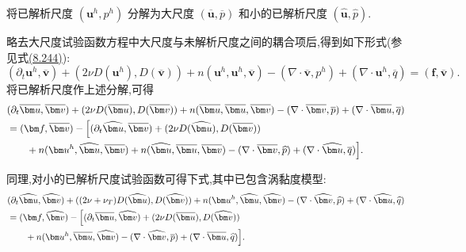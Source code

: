 \begin{note}
\label{note:vms-bubble-basic-equations}
将已解析尺度 $(\bm u^h,p^h)$ 分解为大尺度 $(\overline{\bm u},\overline p)$ 和小的已解析尺度 $(\widehat{\bm u},\widehat p)$.

略去大尺度试验函数方程中大尺度与未解析尺度之间的耦合项后,得到如下形式(参见式\hyperref[eq:vms-three-scale-model-large]{(8.244)}):
\[
 (\partial_t\bm u^h,\overline{\bm v})
 +(2\nu D(\bm u^h),D(\overline{\bm v}))
 +n(\bm u^h,\bm u^h,\overline{\bm v})
 -(\nabla\cdot\overline{\bm v},p^h)
 +(\nabla\cdot\bm u^h,\overline q)
 =(\bm f,\overline{\bm v}).
\]
将已解析尺度作上述分解,可得
\begin{equation}\label{eq:vms-bubble-large-scale-splitting}
\begin{aligned}
 &(\partial_t\overline{\bm u},\overline{\bm v})
 +(2\nu D(\overline{\bm u}),D(\overline{\bm v}))
 +n(\overline{\bm u},\overline{\bm u},\overline{\bm v})
 -(\nabla\cdot\overline{\bm v},\overline p)
 +(\nabla\cdot\overline{\bm u},\overline q)\\
 &=(\bm f,\overline{\bm v})-
 \Bigl[(\partial_t\widehat{\bm u},\overline{\bm v})
 +(2\nu D(\widehat{\bm u}),D(\overline{\bm v}))\\
 &\qquad+n(\bm u^h,\widehat{\bm u},\overline{\bm v})
 +n(\widehat{\bm u},\overline{\bm u},\overline{\bm v})
 -(\nabla\cdot\overline{\bm v},\widehat p)
 +(\nabla\cdot\widehat{\bm u},\overline q)\Bigr].
\end{aligned}
\end{equation}

同理,对小的已解析尺度试验函数可得下式,其中已包含涡黏度模型:
\begin{equation}\label{eq:vms-bubble-small-scale-splitting}
\begin{aligned}
 &(\partial_t\widehat{\bm u},\widehat{\bm v})
 +((2\nu+\nu_T)D(\widehat{\bm u}),D(\widehat{\bm v}))
 +n(\bm u^h,\widehat{\bm u},\widehat{\bm v})
 -(\nabla\cdot\widehat{\bm v},\widehat p)
 +(\nabla\cdot\widehat{\bm u},\widehat q)\\
 &=(\bm f,\widehat{\bm v})-
 \Bigl[(\partial_t\overline{\bm u},\widehat{\bm v})
 +(2\nu D(\overline{\bm u}),D(\widehat{\bm v}))\\
 &\qquad+n(\bm u^h,\overline{\bm u},\widehat{\bm v})
 -(\nabla\cdot\widehat{\bm v},\overline p)
 +(\nabla\cdot\overline{\bm u},\widehat q)\Bigr].
\end{aligned}
\end{equation}
\end{note}

